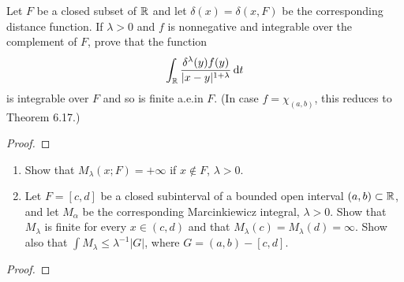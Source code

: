 \begin{problem}
Let $F$ be a closed subset of $\mathbb{R}$ and let $\delta(x)=\delta(x,F)$ be
the corresponding distance function. If $\lambda>0$ and $f$ is nonnegative
and integrable over the complement of $F$, prove that the function
\[
\int_{\mathbb{R}}\frac{\delta^\lambda(y)f(y)}{|x-y|^{1+\lambda}}\mathop{}\!\mathrm{d}
t
\]
is integrable over $F$ and so is finite a.e.\@ in $F$. (In case
$f=\chi_{(a,b)}$, this reduces to Theorem 6.17.)
\end{problem}
\begin{proof}
\end{proof}

\begin{problem}
\begin{enumerate}[label=(\alph*)]
\item Show that $M_\lambda(x;F)=+\infty$ if $x\notin F$, $\lambda>0$.
\item Let $F=[c,d]$ be a closed subinterval of a bounded open interval
  $(a,b)\subset\mathbb{R}$, and let $M_\alpha$ be the corresponding
  Marcinkiewicz integral, $\lambda>0$. Show that $M_\lambda$ is finite for
  every $x\in(c,d)$ and that $M_\lambda(c)=M_\lambda(d)=\infty$. Show also
  that $\int M_\lambda\leq\lambda^{-1}|G|$, where $G=(a,b)-[c,d]$.
\end{enumerate}
\end{problem}
\begin{proof}
\end{proof}

